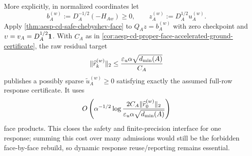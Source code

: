 \begin{proposition}
More explicitly, in normalized coordinates let
\begin{equation*}
 b_A^{(w)}:=D_A^{-1/2}(-H_{Aw})\geq0,
 \qquad
 z_A^{(w)}:=D_A^{1/2}u_A^{(w)}.
\end{equation*}
Apply \cref{thm:aesp-cd-safe-chebyshev-face} to
\(Q_Az=b_A^{(w)}\) with zero checkpoint and
\(\upsilon=v_A=D_A^{1/2}\mathbf{1}\).  With \(C_A\) as in
\cref{cor:aesp-cd-proper-face-accelerated-ground-certificate}, the raw
residual target
\begin{equation}
 \lVert\widehat r_k^{(w)}\rVert_2
 \leq\frac{\varepsilon_u\alpha\sqrt{d_{\min}(A)}}{C_A}
 \label{eq:aesp-cd-proper-face-response-raw-target}
\end{equation}
publishes a possibly sparse \(\widetilde u_A^{(w)}\geq0\) satisfying exactly
the assumed full-row response certificate.  It uses
\begin{equation}
 O\left(
 \alpha^{-1/2}
 \log\frac{2C_A\lVert\widehat r_0^{(w)}\rVert_2}
               {\varepsilon_u\alpha\sqrt{d_{\min}(A)}}
 \right)
 \label{eq:aesp-cd-proper-face-response-safe-work}
\end{equation}
face products.  This closes the safety and finite-precision interface for one
response; summing this cost over many admissions would still be the forbidden
face-by-face rebuild, so dynamic response reuse/reporting remains essential.
\end{proposition}

